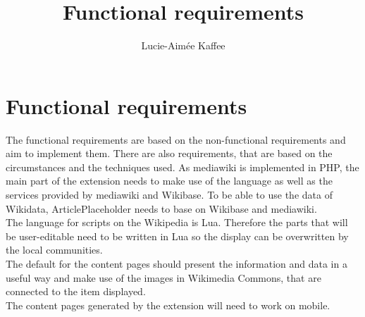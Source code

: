 \documentclass[11pt]{article}
\title {{Functional requirements}}
\author {Lucie-Aim\'{e}e Kaffee}
\date{}
\begin{document}
\section {Functional requirements}
The functional requirements are based on the non-functional requirements and aim to implement them.
There are also requirements, that are based on the circumstances and the techniques used. 
As mediawiki is implemented in PHP, the main part of the extension needs to make use of the language as well as the services provided by mediawiki and Wikibase. To be able to use the data of Wikidata, ArticlePlaceholder needs to base on Wikibase and mediawiki. \\
The language for scripts on the Wikipedia is Lua. Therefore the parts that will be user-editable need to be written in Lua so the display can be overwritten by the local communities. \\
The default for the content pages should present the information and data in a useful way and make use of the images in Wikimedia Commons, that are connected to the item displayed.\\
The content pages generated by the extension will need to work on mobile. \\
 
\end{document}
